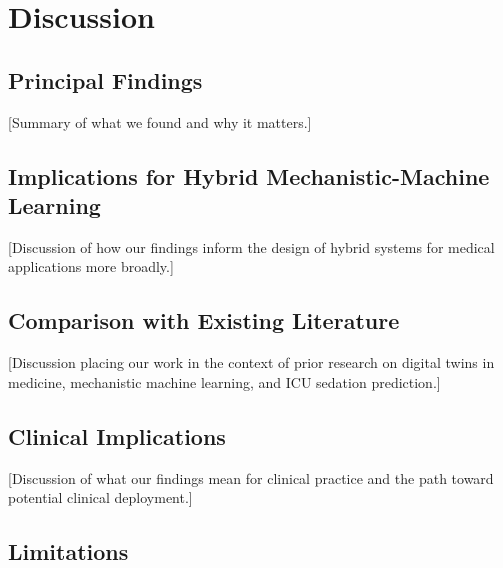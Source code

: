 \documentclass[11pt,a4paper]{article}
\begin{document}
\section{Discussion}

\subsection{Principal Findings}

[Summary of what we found and why it matters.]

\subsection{Implications for Hybrid Mechanistic-Machine Learning}

[Discussion of how our findings inform the design of hybrid systems for medical applications more broadly.]

\subsection{Comparison with Existing Literature}

[Discussion placing our work in the context of prior research on digital twins in medicine, mechanistic machine learning, and ICU sedation prediction.]

\subsection{Clinical Implications}

[Discussion of what our findings mean for clinical practice and the path toward potential clinical deployment.]

\subsection{Limitations}
\end{document}
